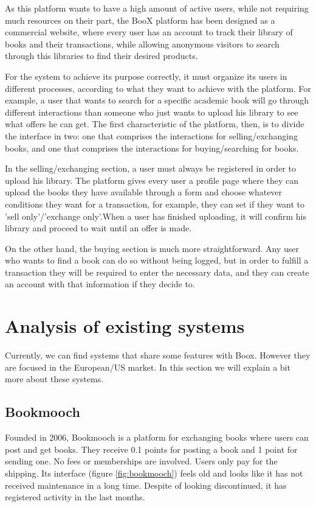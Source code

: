 \documentclass{article}
\begin{document}
As this platform wants to have a high amount of active users, while not requiring much resources on their part, the BooX platform has been designed as a commercial website, where every user has an account to track their library of books and their transactions, while allowing anonymous visitors to search through this libraries to find their desired products.

For the system to achieve its purpose correctly, it must organize its users in different processes, according to what they want to achieve with the platform. For example, a user that wants to search for a specific academic book will go through different interactions than someone who just wants to upload his library to see what offers he can get. The first characteristic of the platform, then, is to divide the interface in two: one that comprises the interactions for selling/exchanging books, and one that comprises the interactions for buying/searching for books.

In the selling/exchanging section, a user must always be registered in order to upload his library. The platform gives every user a profile page where they can upload the books they have available through a form and choose whatever conditions they want for a transaction, for example, they can set if they want to 'sell only'/'exchange only'.When a user has finished uploading, it will confirm his library and proceed to wait until an offer is made.

On the other hand, the buying section is much more straightforward. Any user who wants to find a book can do so without being logged, but in order to fulfill a transaction they will be required to enter the necessary data, and they can create an account with that information if they decide to.


\section{Analysis of existing systems}
Currently, we can find systems that share some features with Boox. However they are focused in the European/US market. In this section we will explain a bit more about these systems.

\subsection{Bookmooch}

Founded in 2006, Bookmooch is a platform for exchanging books where users can post and get books. They receive 0.1 points for posting a book and 1 point for sending one. No fees or memberships are involved. Users only pay for the shipping. Its interface (figure \ref{fig:bookmooch}) feels old and looks like it has not received maintenance in a long time. Despite of looking discontinued, it has registered activity in the last months. 
\end{document}
